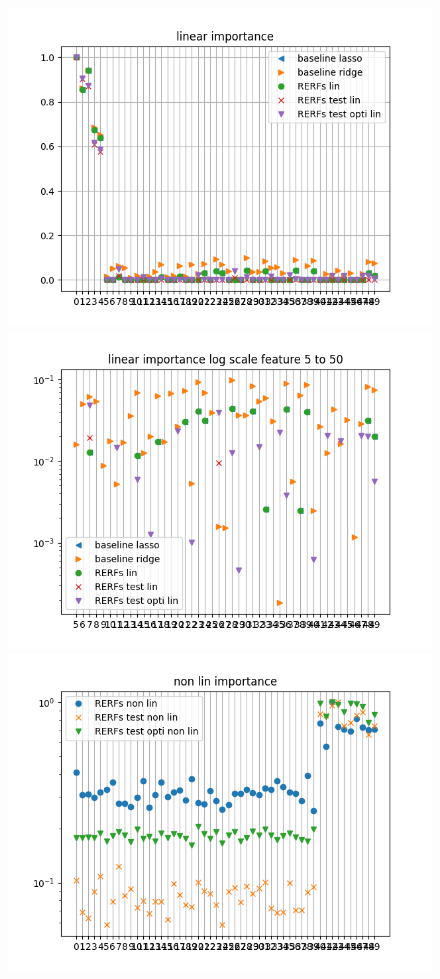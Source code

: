 \documentclass{article}
\begin{document}
\begin{figure}
\includegraphics[scale=0.7]{linear_feature_importance.png}

\includegraphics[scale=0.7]{linear_feature_importance2.png}

\includegraphics[scale=0.7]{non_linear_feature_importance.png}
\end{figure}
\end{document}
